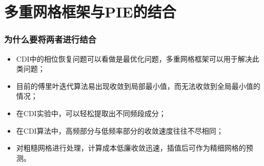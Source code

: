 \documentclass[10pt,aspectratio=169]{beamer} %
\begin{document}
\section{多重网格框架与PIE的结合}

\begin{frame}
    \frametitle{为什么要将两者进行结合}
    \begin{itemize}
        \item CDI中的相位恢复问题可以看做是最优化问题，多重网格框架可以用于解决此类问题；
        \item 目前的傅里叶迭代算法易出现收敛到局部最小值，而无法收敛到全局最小值的情况；
        \item 在CDI实验中，可以轻松提取出不同频段成分；
        \item 在CDI算法中，高频部分与低频率部分的收敛速度往往不尽相同；
        \item 对粗糙网格进行处理，计算成本低廉收敛迅速，插值后可作为精细网格的预测。
    \end{itemize}
    

\end{frame}
\end{document}
